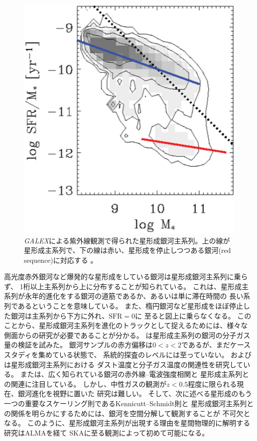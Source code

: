 \begin{figure}[thbp]
\begin{center}
\includegraphics[width=0.5\linewidth]{galaxy/schiminovich2007.eps}
\end{center}
\vspace{-0.3cm}
\caption{{\sl GALEX}による紫外線観測で得られた星形成銀河主系列。上の線が
星形成主系列で、下の線は赤い、星形成を停止しつつある銀河(red sequence)に対応する
\citep[][より改変]{schiminovich2007}。}
\label{fig:sf_ms}
\end{figure}


高光度赤外銀河など爆発的な星形成をしている銀河は星形成銀河主系列に乗らず、
1桁以上主系列から上に分布することが知られている\citep[e.g.,][]{buat2005, buat2007}。
これは、星形成主系列が永年的進化をする銀河の道筋であるか、あるいは単に滞在時間の
長い系列であるということを意味している。
また、楕円銀河など星形成をほぼ停止した銀河は主系列から下方に外れ、$\mbox{SFR} = 0$に
至ると図上に乗らなくなる。
このことから、星形成銀河主系列を進化のトラックとして捉えるためには、様々な
側面からの研究が必要であることが分かる。
\citet{genzel2012}は星形成主系列の銀河の分子ガス量の検証を試みた。
銀河サンプルの赤方偏移は$0 < z < 2$であるが、まだケーススタディを集めている状態で、
系統的探査のレベルには至っていない。
\citet{magnelli2012}および\citet{magnelli2014}は星形成銀河主系列における
ダスト温度と分子ガス温度の関連性を研究している。
また\citet{magnelli2015}は、広く知られている銀河の赤外線--電波強度相関と
星形成主系列との関連に注目している。
しかし、中性ガスの観測が$z < 0.5$程度に限られる現在、銀河進化を視野に置いた
研究は難しい。
そして、次に述べる星形成のもう一つの重要なスケーリング則であるKennicutt--Schmidt則と
星形成銀河主系列との関係を明らかにするためには、銀河を空間分解して観測することが
不可欠となる\citep{teruya2014}。
このように、星形成銀河主系列が出現する理由を星間物理的に解明する研究はALMAを経て
SKAに至る観測によって初めて可能になる。

